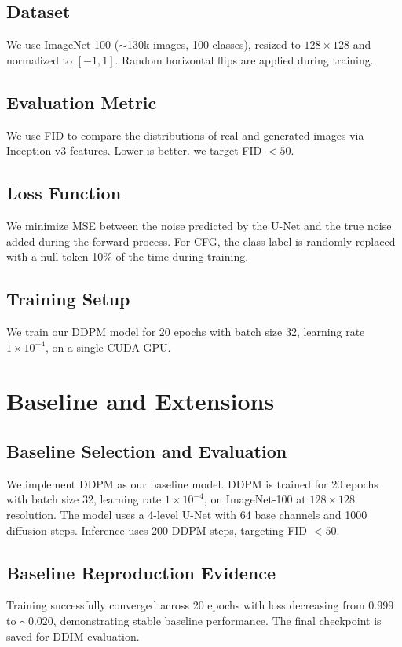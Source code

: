 \documentclass{article}
\begin{document}
\subsection{Dataset}

We use ImageNet-100 ($\sim$130k images, 100 classes), resized to
$128 \times 128$ and normalized to $[-1, 1]$. Random horizontal flips
are applied during training.

\subsection{Evaluation Metric}

We use FID to compare the distributions of real and generated images
via Inception-v3 features. Lower is better. we target FID $< 50$.

\subsection{Loss Function}

We minimize MSE between the noise predicted by the U-Net and the
true noise added during the forward process. For CFG, the class label
is randomly replaced with a null token 10\% of the time during training.

\subsection{Training Setup}

We train our DDPM model for 20 epochs with batch size 32, learning rate $1 \times 10^{-4}$, on a single CUDA GPU.

\section{Baseline and Extensions}

\subsection{Baseline Selection and Evaluation}

We implement DDPM as our baseline model. DDPM is trained for 20 epochs with
batch size 32, learning rate $1 \times 10^{-4}$, on ImageNet-100 at $128 \times 128$ resolution.
The model uses a 4-level U-Net with 64 base channels and 1000 diffusion steps.
Inference uses 200 DDPM steps, targeting FID $< 50$.

\subsection{Baseline Reproduction Evidence}
Training successfully converged across 20 epochs with loss decreasing from 0.999 to $\sim 0.020$, demonstrating stable baseline performance. The final checkpoint is saved for DDIM evaluation.
\end{document}
